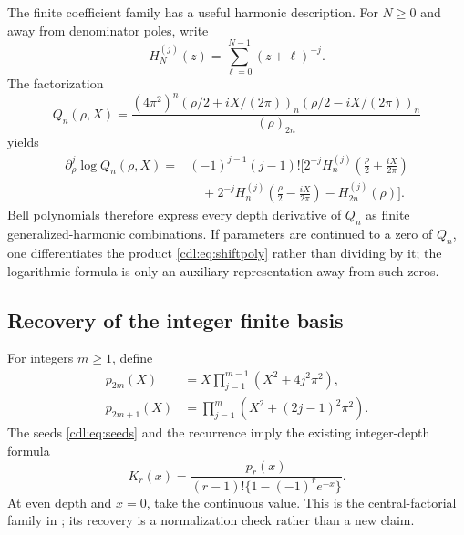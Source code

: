 \documentclass[11pt,letterpaper]{article}
\numberwithin{equation}{section}
\theoremstyle{definition}\newtheorem{definition}[theorem]{Definition}
\theoremstyle{remark}\newtheorem{remark}[theorem]{Remark}
\begin{document}
The finite coefficient family has a useful harmonic description.
For $N\ge0$ and away from denominator poles, write
\[
 H_N^{(j)}(z)=\sum_{\ell=0}^{N-1}(z+\ell)^{-j}.
\]
The factorization
\begin{equation}\label{cdl:eq:PochhammerQ}
 Q_n(\rho,X)=\frac{(4\pi^2)^n
 (\rho/2+iX/(2\pi))_n(\rho/2-iX/(2\pi))_n}{(\rho)_{2n}}
\end{equation}
yields
\begin{equation}\label{cdl:eq:Qjets}
 \begin{split}
 \partial_\rho^j\log Q_n(\rho,X)
 ={}&(-1)^{j-1}(j-1)!\biggl[
 2^{-j}H_n^{(j)}\left(\frac\rho2+\frac{iX}{2\pi}\right)\\
 &\quad+2^{-j}H_n^{(j)}\left(\frac\rho2-\frac{iX}{2\pi}\right)
       -H_{2n}^{(j)}(\rho)\biggr].
 \end{split}
\end{equation}
Bell polynomials therefore express every depth derivative of $Q_n$ as
finite generalized-harmonic combinations. If parameters are continued
to a zero of $Q_n$, one differentiates the product
\eqref{cdl:eq:shiftpoly} rather than dividing by it; the logarithmic
formula is only an auxiliary representation away from such zeros.

\subsection{Recovery of the integer finite basis}
For integers $m\ge1$, define
\begin{align}
 p_{2m}(X)&=X\prod_{j=1}^{m-1}(X^2+4j^2\pi^2),\label{cdl:eq:pEven}\\
 p_{2m+1}(X)&=\prod_{j=1}^{m}(X^2+(2j-1)^2\pi^2).
 \label{cdl:eq:pOdd}
\end{align}
The seeds \eqref{cdl:eq:seeds} and the recurrence imply the existing
integer-depth formula
\begin{equation}\label{cdl:eq:integerK}
 K_r(x)=\frac{p_r(x)}{(r-1)!\{1-(-1)^r e^{-x}\}}.
\end{equation}
At even depth and $x=0$, take the continuous value.
This is the central-factorial family in \cite{RLC}; its recovery is a
normalization check rather than a new claim.
\end{document}
